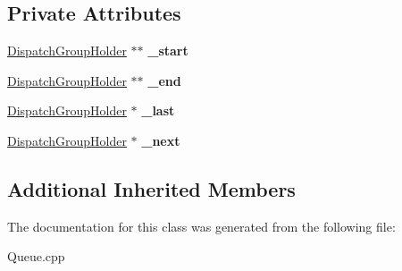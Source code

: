 \subsection*{Private Attributes}
\begin{DoxyCompactItemize}
\item 
\mbox{\label{class_dispatch_group_holder_a4a9eae28e44db90d2a42378d6b9fc0e1}} 
\hyperlink{class_dispatch_group_holder}{Dispatch\+Group\+Holder} $\ast$$\ast$ {\bfseries \+\_\+start}
\item 
\mbox{\label{class_dispatch_group_holder_a263959802537c48cb097bf85d327421c}} 
\hyperlink{class_dispatch_group_holder}{Dispatch\+Group\+Holder} $\ast$$\ast$ {\bfseries \+\_\+end}
\item 
\mbox{\label{class_dispatch_group_holder_afb5567f718605a7aa5034f95797ce844}} 
\hyperlink{class_dispatch_group_holder}{Dispatch\+Group\+Holder} $\ast$ {\bfseries \+\_\+last}
\item 
\mbox{\label{class_dispatch_group_holder_a3176a6a7ccbf8ce86bb6a166e5c786aa}} 
\hyperlink{class_dispatch_group_holder}{Dispatch\+Group\+Holder} $\ast$ {\bfseries \+\_\+next}
\end{DoxyCompactItemize}
\subsection*{Additional Inherited Members}


The documentation for this class was generated from the following file\+:\begin{DoxyCompactItemize}
\item 
Queue.\+cpp\end{DoxyCompactItemize}

